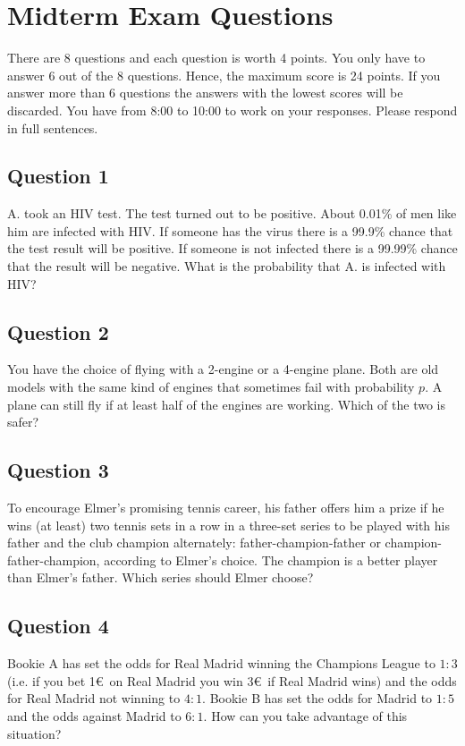 \documentclass[../main/Notes.tex]{subfiles}
\begin{document}
\section{Midterm Exam Questions}
There are 8 questions and each question is worth 4 points. You only have to answer 6 out of the 8 questions. Hence, the maximum score is 24 points. If you answer more than 6 questions the answers with the lowest scores will be discarded. You have from 8:00 to 10:00 to work on your responses. Please respond in full sentences.

\subsection*{Question 1}
A. took an HIV test. The test turned out to be positive. About 0.01\% of men like him are infected with HIV. If someone has the virus there is a 99.9\% chance that the test result will be positive. If someone is not infected there is a 99.99\% chance that the result will be negative. What is the probability that A. is infected with HIV?

\subsection*{Question 2}
You have the choice of flying with a 2-engine or a 4-engine plane. Both are old models with the same kind of engines that sometimes fail with probability $p$. A plane can still fly if at least half of the engines are working. Which of the two is safer?

\subsection*{Question 3}
To encourage Elmer's promising tennis career, his father offers him a prize if he wins (at least) two tennis sets in a row in a three-set series to be played with his father and the club champion alternately: father-champion-father or champion-father-champion, according to Elmer's choice. The champion is a better player than Elmer's father. Which series should Elmer choose?

\subsection*{Question 4}
Bookie A has set the odds for Real Madrid winning the Champions League to $1:3$ (i.e. if you bet 1\euro\ on Real Madrid you win 3\euro\ if Real Madrid wins) and the odds for Real Madrid not winning to $4:1$. Bookie B has set the odds for Madrid to $1:5$ and the odds against Madrid to $6:1$. How can you take advantage of this situation?
\end{document}
